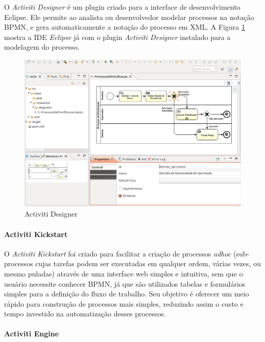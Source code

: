 O \textit{Activiti Designer} é um plugin criado para a interface de desenvolvimento Eclipse. Ele permite ao analista ou desenvolvedor modelar processos na notação BPMN, e gera automaticamente a notação do processo em XML. A Figura \ref{fig:activiti_designer} mostra a IDE\cite{ide} \textit{Eclipse} já com o plugin \textit{Activiti Designer} instalado para a modelagem do processo.

\begin{figure}[H]
\centering
\includegraphics[width=1\textwidth]{imagens/activiti_designer.png}
\caption{Activiti Designer}
\label{fig:activiti_designer}
\end{figure}

\paragraph{Activiti Kickstart}\label{sec:automatizacao_processos-gestao_processos_activiti_kickstart}

O \textit{Activiti Kickstart} foi criado para facilitar a criação de processos \textit{adhoc} (sub-processos cujas tarefas podem ser executadas em qualquer ordem, várias vezes, ou mesmo puladas) através de uma interface web simples e intuitiva, sem que o usuário necessite conhecer BPMN, já que são utilizados tabelas e formulários simples para a definição do fluxo de trabalho. Seu objetivo é oferecer um meio rápido para construção de processos mais simples, reduzindo assim o custo e tempo investido na automatização desses processos.

\paragraph{Activiti Engine}\label{sec:automatizacao_processos-gestao_processos_activiti_engine}

